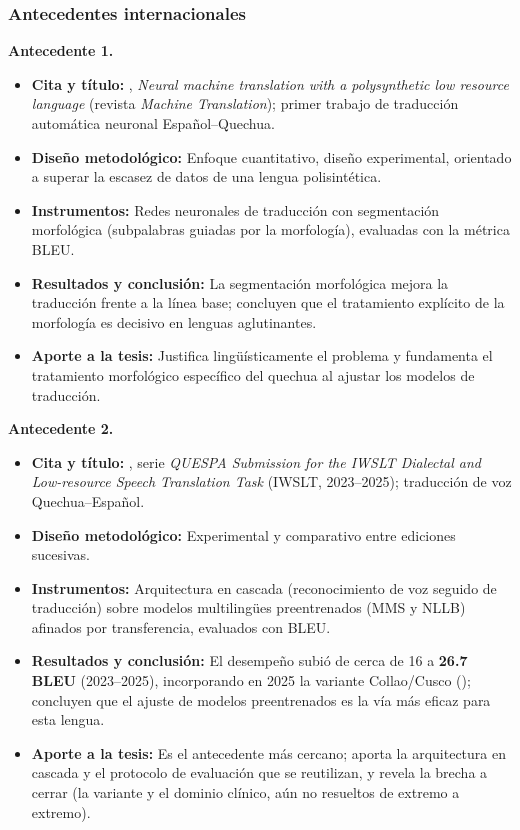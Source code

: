 \subsubsection{Antecedentes internacionales}
\begin{bloqueObsDos}
\noindent\textbf{Antecedente 1.}
\begin{itemize}\setlength{\itemsep}{1pt}
  \item \textbf{Cita y t{\'i}tulo:} \textcite{ortega2020quechua}, \emph{Neural machine translation with a polysynthetic low resource language} (revista \emph{Machine Translation}); primer trabajo de traducci{\'o}n autom{\'a}tica neuronal Espa{\~n}ol--Quechua.
  \item \textbf{Dise{\~n}o metodol{\'o}gico:} Enfoque cuantitativo, dise{\~n}o experimental, orientado a superar la escasez de datos de una lengua polisint{\'e}tica.
  \item \textbf{Instrumentos:} Redes neuronales de traducci{\'o}n con segmentaci{\'o}n morfol{\'o}gica (subpalabras guiadas por la morfolog{\'i}a), evaluadas con la m{\'e}trica BLEU.
  \item \textbf{Resultados y conclusi{\'o}n:} La segmentaci{\'o}n morfol{\'o}gica mejora la traducci{\'o}n frente a la l{\'i}nea base; concluyen que el tratamiento expl{\'i}cito de la morfolog{\'i}a es decisivo en lenguas aglutinantes.
  \item \textbf{Aporte a la tesis:} Justifica ling{\"u}{\'i}sticamente el problema y fundamenta el tratamiento morfol{\'o}gico espec{\'i}fico del quechua al ajustar los modelos de traducci{\'o}n.
\end{itemize}

\noindent\textbf{Antecedente 2.}
\begin{itemize}\setlength{\itemsep}{1pt}
  \item \textbf{Cita y t{\'i}tulo:} \textcite{Ortega2023261,Ortega2025260}, serie \emph{QUESPA Submission for the IWSLT Dialectal and Low-resource Speech Translation Task} (IWSLT, 2023--2025); traducci{\'o}n de voz Quechua--Espa{\~n}ol.
  \item \textbf{Dise{\~n}o metodol{\'o}gico:} Experimental y comparativo entre ediciones sucesivas.
  \item \textbf{Instrumentos:} Arquitectura en cascada (reconocimiento de voz seguido de traducci{\'o}n) sobre modelos multiling{\"u}es preentrenados (MMS y NLLB) afinados por transferencia, evaluados con BLEU.
  \item \textbf{Resultados y conclusi{\'o}n:} El desempe{\~n}o subi{\'o} de cerca de 16 a \textbf{26.7 BLEU} (2023--2025), incorporando en 2025 la variante Collao/Cusco (); concluyen que el ajuste de modelos preentrenados es la v{\'i}a m{\'a}s eficaz para esta lengua.
  \item \textbf{Aporte a la tesis:} Es el antecedente m{\'a}s cercano; aporta la arquitectura en cascada y el protocolo de evaluaci{\'o}n que se reutilizan, y revela la brecha a cerrar (la variante  y el dominio cl{\'i}nico, a{\'u}n no resueltos de extremo a extremo).
\end{itemize}
\end{bloqueObsDos}

